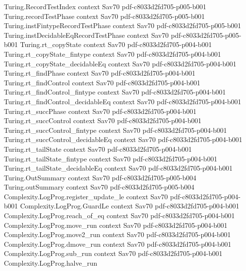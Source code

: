\begin{theorem}
\proofstep
  {Turing.RecordTestIndex}
  {context}
  {Sav70}
  {pdf-c8033d2fd705-p005-b001}
\proofstep
  {Turing.recordTestPhase}
  {context}
  {Sav70}
  {pdf-c8033d2fd705-p005-b001}
\proofstep
  {Turing.instFintypeRecordTestPhase}
  {context}
  {Sav70}
  {pdf-c8033d2fd705-p005-b001}
\proofstep
  {Turing.instDecidableEqRecordTestPhase}
  {context}
  {Sav70}
  {pdf-c8033d2fd705-p005-b001}
\proofstep
  {Turing.rt_copyState}
  {context}
  {Sav70}
  {pdf-c8033d2fd705-p004-b001}
\proofstep
  {Turing.rt_copyState_fintype}
  {context}
  {Sav70}
  {pdf-c8033d2fd705-p004-b001}
\proofstep
  {Turing.rt_copyState_decidableEq}
  {context}
  {Sav70}
  {pdf-c8033d2fd705-p004-b001}
\proofstep
  {Turing.rt_findPhase}
  {context}
  {Sav70}
  {pdf-c8033d2fd705-p004-b001}
\proofstep
  {Turing.rt_findControl}
  {context}
  {Sav70}
  {pdf-c8033d2fd705-p004-b001}
\proofstep
  {Turing.rt_findControl_fintype}
  {context}
  {Sav70}
  {pdf-c8033d2fd705-p004-b001}
\proofstep
  {Turing.rt_findControl_decidableEq}
  {context}
  {Sav70}
  {pdf-c8033d2fd705-p004-b001}
\proofstep
  {Turing.rt_succPhase}
  {context}
  {Sav70}
  {pdf-c8033d2fd705-p004-b001}
\proofstep
  {Turing.rt_succControl}
  {context}
  {Sav70}
  {pdf-c8033d2fd705-p004-b001}
\proofstep
  {Turing.rt_succControl_fintype}
  {context}
  {Sav70}
  {pdf-c8033d2fd705-p004-b001}
\proofstep
  {Turing.rt_succControl_decidableEq}
  {context}
  {Sav70}
  {pdf-c8033d2fd705-p004-b001}
\proofstep
  {Turing.rt_tailState}
  {context}
  {Sav70}
  {pdf-c8033d2fd705-p004-b001}
\proofstep
  {Turing.rt_tailState_fintype}
  {context}
  {Sav70}
  {pdf-c8033d2fd705-p004-b001}
\proofstep
  {Turing.rt_tailState_decidableEq}
  {context}
  {Sav70}
  {pdf-c8033d2fd705-p004-b001}
\proofstep
  {Turing.OutSummary}
  {context}
  {Sav70}
  {pdf-c8033d2fd705-p005-b004}
\proofstep
  {Turing.outSummary}
  {context}
  {Sav70}
  {pdf-c8033d2fd705-p005-b004}
\proofstep
  {Complexity.LogProg.register_update_le}
  {context}
  {Sav70}
  {pdf-c8033d2fd705-p004-b001}
\proofstep
  {Complexity.LogProg.GuardLe}
  {context}
  {Sav70}
  {pdf-c8033d2fd705-p004-b001}
\proofstep
  {Complexity.LogProg.reach_of_eq}
  {context}
  {Sav70}
  {pdf-c8033d2fd705-p004-b001}
\proofstep
  {Complexity.LogProg.move_run}
  {context}
  {Sav70}
  {pdf-c8033d2fd705-p004-b001}
\proofstep
  {Complexity.LogProg.move2_run}
  {context}
  {Sav70}
  {pdf-c8033d2fd705-p004-b001}
\proofstep
  {Complexity.LogProg.dmove_run}
  {context}
  {Sav70}
  {pdf-c8033d2fd705-p004-b001}
\proofstep
  {Complexity.LogProg.sub_run}
  {context}
  {Sav70}
  {pdf-c8033d2fd705-p004-b001}
\proofstep
  {Complexity.LogProg.halve_run}

\end{theorem}
